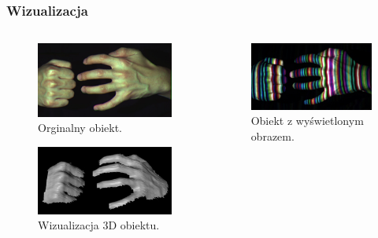 \documentclass{beamer}
\begin{document}
\begin{frame}\frametitle{Wizualizacja}

    \begin{columns}
    
      \begin{column}{6cm}

\begin{figure}[htb]
	\begin{center}
		\includegraphics[angle=0,scale=0.4]{hand1.jpg}
		\caption{Orginalny obiekt.}
	\end{center}
\end{figure}	
	
\begin{figure}[htb]
	\begin{center}
		\includegraphics[angle=0,scale=0.4]{hand3.jpg}
		\caption{Wizualizacja 3D obiektu.}
	\end{center}
\end{figure}

    \end{column}
    
    \begin{column}{6cm}
     
\begin{figure}[htb]
	\begin{center}
		\includegraphics[angle=0,scale=0.4]{hand2.jpg}
		\caption{Obiekt z wyświetlonym obrazem.}
	\end{center}
\end{figure}	     
     
    \end{column}

  \end{columns}

\end{frame}
\end{document}
